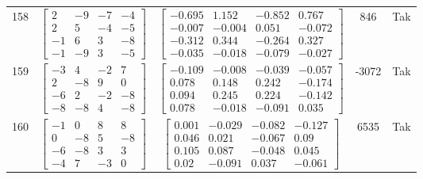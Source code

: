 \documentclass[a4paper,12pt]{article}
\begin{document}
\begin{tabular}{c c c c c}
158
&
$\begin{bmatrix} 2 & -9 & -7 & -4 \\ 2 & 5 & -4 & -5 \\ -1 & 6 & 3 & -8 \\ -1 & -9 & 3 & -5 \end{bmatrix}$
&
$\begin{bmatrix} -0.695 & 1.152 & -0.852 & 0.767 \\ -0.007 & -0.004 & 0.051 & -0.072 \\ -0.312 & 0.344 & -0.264 & 0.327 \\ -0.035 & -0.018 & -0.079 & -0.027 \end{bmatrix}$
&
846
&
Tak
\\
159
&
$\begin{bmatrix} -3 & 4 & -2 & 7 \\ 2 & -8 & 9 & 0 \\ -6 & 2 & -2 & -8 \\ -8 & -8 & 4 & -8 \end{bmatrix}$
&
$\begin{bmatrix} -0.109 & -0.008 & -0.039 & -0.057 \\ 0.078 & 0.148 & 0.242 & -0.174 \\ 0.094 & 0.245 & 0.224 & -0.142 \\ 0.078 & -0.018 & -0.091 & 0.035 \end{bmatrix}$
&
-3072
&
Tak
\\
160
&
$\begin{bmatrix} -1 & 0 & 8 & 8 \\ 0 & -8 & 5 & -8 \\ -6 & -8 & 3 & 3 \\ -4 & 7 & -3 & 0 \end{bmatrix}$
&
$\begin{bmatrix} 0.001 & -0.029 & -0.082 & -0.127 \\ 0.046 & 0.021 & -0.067 & 0.09 \\ 0.105 & 0.087 & -0.048 & 0.045 \\ 0.02 & -0.091 & 0.037 & -0.061 \end{bmatrix}$
&
6535
&
Tak
\\
\end{tabular} \egroup \newpage
\end{document}
